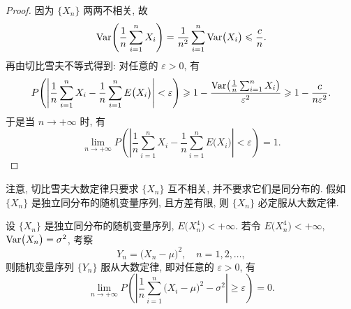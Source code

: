 \begin{proof}
    因为 $ \{ X_n \} $ 两两不相关, 故
    \begin{equation*}
       \Var  \left( \frac{1}{n} \sum_{i=1}^n X_i \right) = \frac{1}{n^2} \sum_{i=1}^n\Var  \bigl( X_i \bigr) \leq \frac{c}{n}.
    \end{equation*}
    再由切比雪夫不等式得到: 对任意的 $ \varepsilon > 0 $, 有
    \begin{equation*}
        P \left( \left\lvert \frac{1}{n} \sum_{i=1}^n X_i - \frac{1}{n} \sum_{i=1}^n E \bigl( X_i \bigr) \right\rvert < \varepsilon \right) \geq 1 - \frac{\Var\left( \frac{1}{n} \sum_{i=1}^n X_i \right)}{\varepsilon^2} \geq 1 - \frac{c}{n\varepsilon^2}.
    \end{equation*}
    于是当 $ n \to +\infty $ 时, 有
    \begin{equation*}
        \lim_{n \to +\infty} P \left( \left\lvert \frac{1}{n} \sum_{i=1}^n X_i - \frac{1}{n} \sum_{i=1}^n E \bigl( X_i \bigr) \right\rvert < \varepsilon \right) = 1.
    \end{equation*}
\end{proof}

注意, 切比雪夫大数定律只要求 $ \{ X_n \} $ 互不相关, 并不要求它们是同分布的.
假如 $ \{ X_n \} $ 是独立同分布的随机变量序列, 且方差有限, 则 $ \{ X_n \} $ 必定服从大数定律.

\begin{example}\label{exam:4.2.2}
    设 $ \{ X_n \} $ 是独立同分布的随机变量序列, $ E \bigl( X_n^4 \bigr) < +\infty $. 若令 $ E \bigl( X_n^4 \bigr) < +\infty $, $\operatorname{Var}  \bigl( X_n \bigr)= \sigma^2 $, 考察
    \begin{equation*}
        Y_n = \bigl( X_n - \mu \bigr)^2, \quad n = 1, 2, \dotsc,
    \end{equation*}
    则随机变量序列 $ \{ Y_n \} $ 服从大数定律, 即对任意的 $ \varepsilon > 0 $, 有
    \begin{equation*}
        \lim_{n \to +\infty} P \left( \left\lvert \frac{1}{n} \sum_{i=1}^n \bigl( X_i - \mu \bigr)^2 - \sigma^2 \right\rvert \geq \varepsilon \right) = 0.
    \end{equation*}
\end{example}

